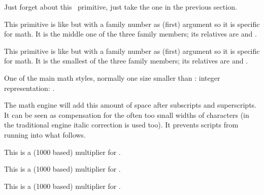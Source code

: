 \stopnewprimitive

\startoldprimitive[title={\prm {scantokens}}]

Just forget about this \ETEX\ primitive, just take the one in the previous section.

\stopoldprimitive

\startoldprimitive[title={\prm {scriptfont}}]

This primitive is like  but with a family number as (first) argument
so it is specific for math. It is the middle one of the three family members; its
relatives are  and .

\stopoldprimitive

\startoldprimitive[title={\prm {scriptscriptfont}}]

This primitive is like  but with a family number as (first) argument
so it is specific for math. It is the smallest of the three family members; its
relatives are  and .

\stopoldprimitive

\startoldprimitive[title={\prm {scriptscriptstyle}}]

One of the main math styles, normally one size smaller than :
integer representation: \the\scriptscriptstyle.

\stopoldprimitive

\startoldprimitive[title={\prm {scriptspace}}][obsolete=yes]

The math engine will add this amount of space after subscripts and superscripts.
It can be seen as compensation for the often too small widths of characters (in
the traditional engine italic correction is used too). It prevents scripts from
running into what follows.

\stopoldprimitive

\startnewprimitive[title={\prm {scriptspaceafterfactor}}]

This is a (1000 based) multiplier for .

\stopnewprimitive

\startnewprimitive[title={\prm {scriptspacebeforefactor}}]

This is a (1000 based) multiplier for .

\stopnewprimitive

\startnewprimitive[title={\prm {scriptspacebetweenfactor}}]

This is a (1000 based) multiplier for .

